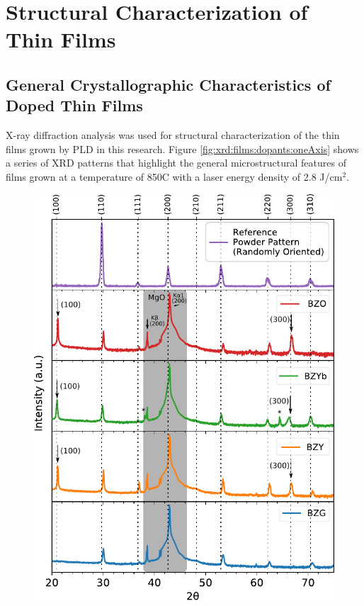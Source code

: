 \vspace{12pt}
\section{Structural Characterization of Thin Films}
\subsection{General Crystallographic Characteristics of Doped Thin Films}
X-ray diffraction analysis was used for structural characterization of the thin films grown by PLD in this research. Figure \ref{fig:xrd:films:dopants:oneAxis} shows a series of XRD patterns that highlight the general microstructural features of films grown at a temperature of 850\textdegree C with a laser energy density of 2.8 J/cm$^2$. 
\begin{figure}
    \centering
    \includegraphics{Figures/190524-xrd-bzo-bzg-bzy-bzyb-thin-films-3-edit.pdf}

\end{figure}
